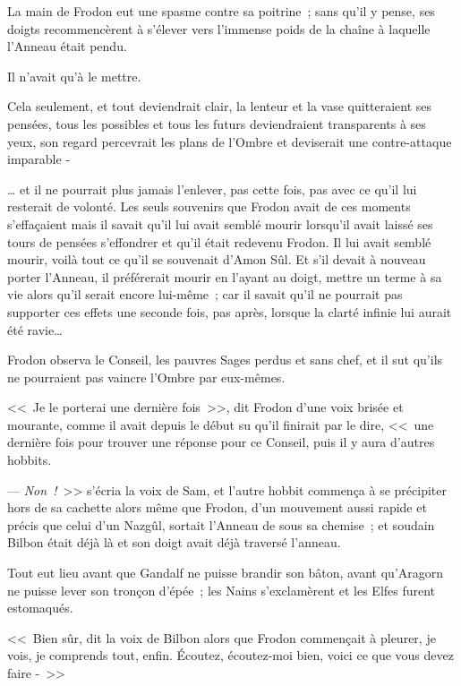 La main de Frodon eut une spasme contre sa poitrine~; sans qu'il y pense, ses doigts recommencèrent à s'élever vers l'immense poids de la chaîne à laquelle l'Anneau était pendu.

Il n'avait qu'à le mettre.

Cela seulement, et tout deviendrait clair, la lenteur et la vase quitteraient ses pensées, tous les possibles et tous les futurs deviendraient transparents à ses yeux, son regard percevrait les plans de l'Ombre et deviserait une contre-attaque imparable -

… et il ne pourrait plus jamais l'enlever, pas cette fois, pas avec ce qu'il lui resterait de volonté. Les seuls souvenirs que Frodon avait de ces moments s'effaçaient mais il savait qu'il lui avait semblé mourir lorsqu'il avait laissé ses tours de pensées s'effondrer et qu'il était redevenu Frodon. Il lui avait semblé mourir, voilà tout ce qu'il se souvenait d'Amon Sûl. Et s'il devait à nouveau porter l'Anneau, il préférerait mourir en l'ayant au doigt, mettre un terme à sa vie alors qu'il serait encore lui-même~; car il savait qu'il ne pourrait pas supporter ces effets une seconde fois, pas après, lorsque la clarté infinie lui aurait été ravie…

Frodon observa le Conseil, les pauvres Sages perdus et sans chef, et il sut qu'ils ne pourraient pas vaincre l'Ombre par eux-mêmes.

<<~Je le porterai une dernière fois~>>, dit Frodon d'une voix brisée et mourante, comme il avait depuis le début su qu'il finirait par le dire, <<~une dernière fois pour trouver une réponse pour ce Conseil, puis il y aura d'autres hobbits.

--- \emph{Non~!}~>> s'écria la voix de Sam, et l'autre hobbit commença à se précipiter hors de sa cachette alors même que Frodon, d'un mouvement aussi rapide et précis que celui d'un Nazgûl, sortait l'Anneau de sous sa chemise~; et soudain Bilbon était déjà là et son doigt avait déjà traversé l'anneau.

Tout eut lieu avant que Gandalf ne puisse brandir son bâton, avant qu'Aragorn ne puisse lever son tronçon d'épée~; les Nains s'exclamèrent et les Elfes furent estomaqués.

<<~Bien sûr, dit la voix de Bilbon alors que Frodon commençait à pleurer, je vois, je comprends tout, enfin. Écoutez, écoutez-moi bien, voici ce que vous devez faire -~>>


